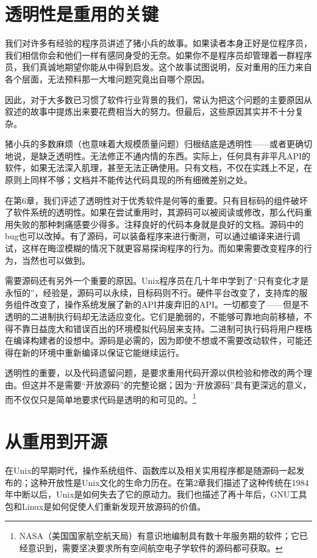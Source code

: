 \documentclass[12pt,oneside]{ctexbook}
\begin{document}
\begin{common-format}
\section{透明性是重用的关键}
我们对许多有经验的程序员讲述了猪小兵的故事。如果读者本身正好是位程序员，我们相信你会和他们一样有感同身受的无奈。如果你不是程序员却管理着一群程序员，我们真诚地期望你能从中得到启发。这个故事试图说明，反对重用的压力来自各个层面，无法预料那一大堆问题究竟出自哪个原因。

因此，对于大多数已习惯了软件行业背景的我们，常认为把这个问题的主要原因从叙述的故事中提炼出来要花费相当大的努力。但最后，这些原因其实并不十分复杂。

猪小兵的多数麻烦（也意味着大规模质量问题）归根结底是透明性——或者更确切地说，是缺乏透明性。无法修正不通内情的东西。实际上，任何具有非平凡API的软件，如果无法深入肌理，甚至无法正确使用。只有文档，不仅在实践上不足，在原则上同样不够；文档并不能传达代码具现的所有细微差别之处。

在第6章，我们评述了透明性对于优秀软件是何等的重要。只有目标码的组件破坏了软件系统的透明性。如果在尝试重用时，其源码可以被阅读或修改，那么代码重用失败的那种刺痛感要少得多。注释良好的代码本身就是良好的文档。源码中的bug也可以改掉。有了源码，可以装备程序来进行衡测，可以通过编译来进行调试，这样在晦涩模糊的情况下就更容易探询程序的行为。而如果需要改变程序的行为，当然也可以做到。

需要源码还有另外一个重要的原因。Unix程序员在几十年中学到了“只有变化才是永恒的”，经验是，源码可以永续，目标码则不行。硬件平台改变了，支持库的服务组件改变了，操作系统发展了新的API并废弃旧的API。一切都变了——但是不透明的二进制执行码却无法适应变化。它们是脆弱的，不能够可靠地向前移植，不得不靠日益庞大和错误百出的环境模拟代码层来支持。二进制可执行码将用户桎梏在编译构建者的设想中。源码是必需的，因为即使不想或不需要改动软件，可能还得在新的环境中重新编译以保证它能继续运行。

透明性的重要，以及代码遗留问题，是要求重用代码开源以供检验和修改的两个理由。但这并不是需要“开放源码”的完整论据；因为“开放源码”具有更深远的意义，而不仅仅只是简单地要求代码是透明的和可见的。\footnote{NASA（美国国家航空航天局）有意识地编制具有数十年服务期的软件；它已经意识到，需要坚决要求所有空间航空电子学软件的源码都可获取。}


\section{从重用到开源}
在Unix的早期时代，操作系统组件、函数库以及相关实用程序都是随源码一起发布的；这种开放性是Unix文化的生命力历在。在第2章我们描述了这种传统在1984年中断以后，Unix是如何失去了它的原动力。我们也描述了再十年后，GNU工具包和Linux是如何促使人们重新发现开放源码的价值。


\end{common-format}
\end{document}
